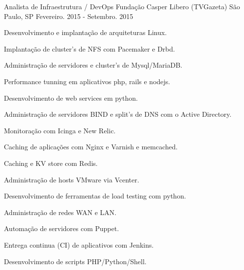 \begin{cventries}
  \cventry
  {Analista de Infraestrutura / DevOps} %
  {Fundação Casper Libero (TVGazeta)} %
  {São Paulo, SP} %
  {Fevereiro. 2015 - Setembro. 2015} %
  {
    \begin{cvitems} %
      \item  {Desenvolvimento e implantação de arquiteturas Linux.}
      \item  {Implantação de cluster’s de NFS com Pacemaker e Drbd.}
      \item  {Administração de servidores e cluster’s de Mysql/MariaDB.}
      \item  {Performance tunning em aplicativos php, rails e nodejs.}
      \item  {Desenvolvimento de web services em python.}
      \item  {Administração de servidores BIND e split’s de DNS com o Active Directory.}
      \item  {Monitoração com Icinga e New Relic.}
      \item  {Caching de aplicações com Nginx e Varnish e memcached.}
      \item  {Caching e KV store com Redis.}
      \item  {Administração de hosts VMware via Vcenter.}
      \item  {Desenvolvimento de ferramentas de load testing com python. }
      \item  {Administração de redes WAN e LAN.}
      \item  {Automação de servidores com Puppet.}
      \item  {Entrega continua (CI) de aplicativos com Jenkins.}
      \item  {Desenvolvimento de scripts PHP/Python/Shell.}
    \end{cvitems}
  }



\end{cventries}

